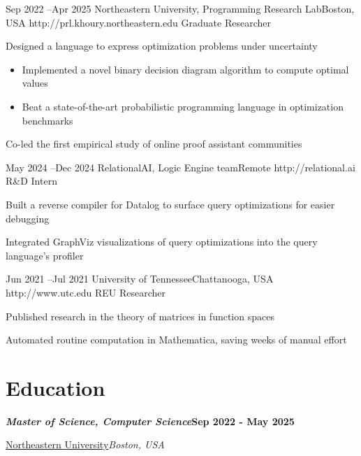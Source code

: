 \documentclass[11pt]{article} %
\begin{document}
\job
{Sep 2022 --}{Apr 2025}
{Northeastern University, Programming Research Lab}{Boston, USA}
{http://prl.khoury.northeastern.edu}
{Graduate Researcher}
{
    \item Designed a language to express optimization problems under uncertainty~\cite{cho2025}
    \begin{itemize}
        \item Implemented a novel binary decision diagram algorithm to compute optimal values
        \item Beat a state-of-the-art probabilistic programming language in optimization benchmarks
    \end{itemize}
    \item Co-led the first empirical study of online proof assistant communities~\cite{lincroft2024}
}

\job
{May 2024 --}{Dec 2024}
{RelationalAI, Logic Engine team}{Remote}
{http://relational.ai}
{R\&D Intern}
{
    \item Built a reverse compiler for Datalog to surface query optimizations for easier debugging
    \item Integrated GraphViz visualizations of query optimizations into the query language's profiler
}

\job
{Jun 2021 --}{Jul 2021}
{University of Tennessee}{Chattanooga, USA}
{http://www.utc.edu}
{REU Researcher}
{
    \item Published research in the theory of matrices in function spaces~\cite{cho2021krein}
    \item Automated routine computation in Mathematica, saving weeks of manual effort
}


\newcommand{\education}[6]{%
{\setlength{\parskip}{0pt}%
\par\noindent\textbf{\textit{#6}}\hfill\textbf{#1 #2}\par
\noindent\href{#5}{#3}\hfill\textit{#4}\par}
\nopagebreak
\vspace{0.3em}
}

\section{Education}

\education
{Sep 2022 -}{May 2025}
{Northeastern University}{Boston, USA}
{http://www.northeastern.edu}
{Master of Science, Computer Science}
\end{document}
